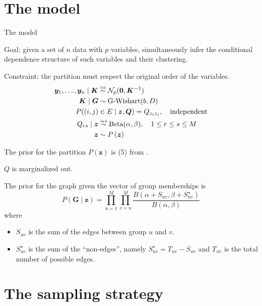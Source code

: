 
\section{The model}

\begin{frame}{The model}

\alert{Goal}: given a set of $n$ data with $p$ variables, simultaneously infer the conditional dependence structure of such variables and their clustering.

\pause

\alert{Constraint}: the partition must respect the original order of the variables.
\pause
\begin{align*}
    \bm{y}_1, \ldots, \bm{y}_n \mid \bm{K} & \overset{\text{\tiny{iid}}}{\sim} \mathcal{N}_p(\mathbf{0}, \bm{K}^{-1} ) \\
    \bm{K} \mid \bm{G} & \sim \operatorname{G-Wishart}(b, D)\\
    P((i,j)&\in E\mid \bm{z},\bm{Q}) = Q_{z_{i} z_{j}},\quad \text{independent}\\
        Q_{rs} \mid \bm{z} &\overset{\text{\tiny{ind}}}{\sim} \operatorname{Beta}(\alpha,\beta), \quad 1\leq r\leq s\leq M\\
    \bm{z} & \sim P\left(\bm{z}\right)
\end{align*}

The prior for the \alert{partition} $P(\bm{z})$ is (5) from \cite{martinezNonparametricChangePoint2014}.

\end{frame}

\begin{frame}

$Q$ is marginalized out.
\pause

The prior for the \alert{graph} given the vector of group memberships is
\[
    P(\bm{G}\mid \bm{z})
    =
    \prod_{u=1}^{M}\prod_{v=u}^{M}
    \frac{B(\alpha + S_{uv}, \beta+ S^{\star}_{uv})}{B(\alpha,\beta)}
\]
where 
\begin{itemize}
    \item $S_{uv}$ is the sum of the edges between group $u$ and $v$.
    \item $S^{\star}_{uv}$ is the sum of the ``non-edges'', namely $S^{\star}_{uv} = T_{uv} - S_{uv}$ and $T_{uv}$ is the total number of possible edges.
\end{itemize}


\end{frame}


\section{The sampling strategy}

